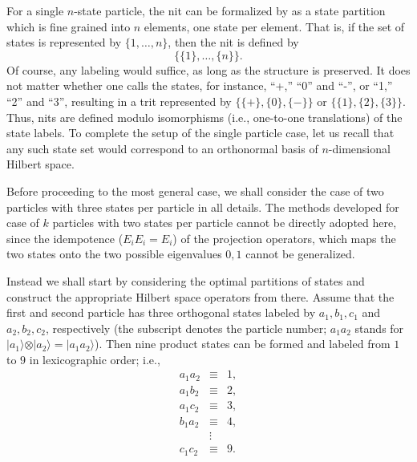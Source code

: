 For a single $n$-state particle, the nit can be formalized by as a state partition
which is fine grained into $n$ elements, one state per element.
That is,
if the set of states is represented by $\{1,\ldots ,n\}$,
then the nit is defined by
\begin{equation}
\{\{1\} ,\ldots ,\{n\}\}
.
\label{2002-statepart-snit}
\end{equation}
Of course, any labeling would suffice, as long as the structure is preserved.
It does not matter
whether one calls the states, for instance, ``+,'' ``0'' and  ``-'', or ``1,'' ``2'' and ``3'',
resulting in a trit represented by
$\{\{+\} ,\{0\} ,\{-\}\}$ or
$\{\{1\} ,\{2\} ,\{3\}\}$.
Thus, nits are defined modulo isomorphisms (i.e., one-to-one translations)
of the state labels.
To complete the setup of the single particle case, let us
recall that any such state set would correspond to an orthonormal
basis of $n$-dimensional Hilbert space.


Before proceeding to the most general case,
we shall consider the case of two particles
with three states per particle in all details.
The methods  developed \cite{DonSvo01} for case of $k$
particles
with two states per particle cannot be directly adopted here,
since the idempotence ($E_iE_i=E_i$) of the projection operators,
which maps the two states onto the two possible eigenvalues $0,1$ cannot
be generalized.

Instead we shall start by considering the optimal partitions of
states and construct the appropriate Hilbert space operators from there.
Assume that the first and second particle
has three orthogonal states labeled by
$a_1,b_1,c_1$
and
$a_2,b_2,c_2$,
respectively
(the subscript denotes the particle number;
$a_1a_2$ stands for
$
\vert a_1\rangle \otimes \vert a_2\rangle
=
\vert a_1 a_2\rangle
$).
Then nine product states can be formed and labeled from $1$ to $9$ in
lexicographic order; i.e.,
\begin{equation}
\begin{array}{llll}
a_1a_2 &\equiv&1,\\
a_1b_2 &\equiv&2,\\
a_1c_2 &\equiv&3,\\
b_1a_2 &\equiv&4,\\
  &\vdots& \\
c_1c_2 &\equiv&9.\\
\end{array}
\label{2002-statepart-ps3}
\end{equation}

